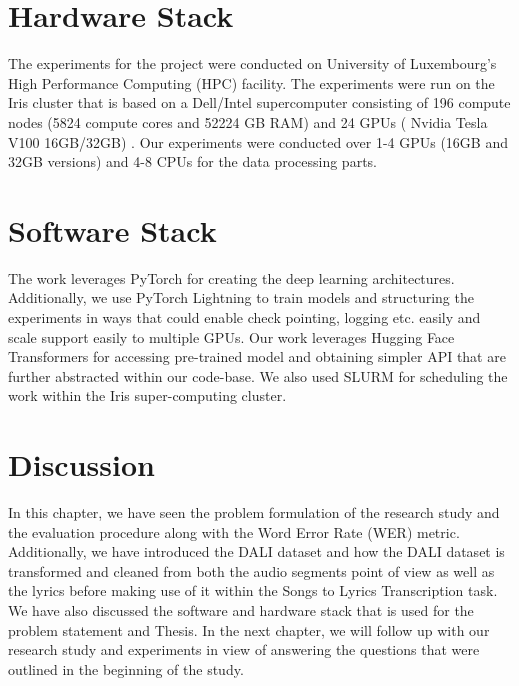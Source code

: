 \section{Hardware Stack}%
\label{sec:hpc}
The experiments for the project were conducted on University of Luxembourg's High Performance Computing (HPC) facility. The experiments were run on the Iris cluster that is based on a Dell/Intel supercomputer consisting of 196 compute nodes (5824 compute cores and 52224 GB RAM) and 24 GPUs ( Nvidia Tesla V100 16GB/32GB) \cite{VBCG_HPCS14}. Our experiments were conducted over 1-4 GPUs (16GB and 32GB versions) and 4-8 CPUs for the data processing parts.

\section{Software Stack}%
\label{sec:softwarestack}

The work leverages PyTorch \cite{paszke2019pytorch} for creating the deep learning architectures. Additionally, we use PyTorch Lightning\cite{Falcon_PyTorch_Lightning_2019} to train models and structuring the experiments in ways that could enable check pointing, logging etc. easily and scale support easily to multiple GPUs. Our work leverages Hugging Face Transformers \cite{wolf-etal-2020-transformers} for accessing pre-trained model and obtaining simpler API that are further abstracted within our code-base. We also used SLURM \cite{yoo2003slurm} for scheduling the work within the Iris super-computing cluster.


\section{Discussion}

In this chapter, we have seen the problem formulation of the research study and the evaluation procedure along with the Word Error Rate (WER) metric. Additionally, we have introduced the DALI dataset and how the DALI dataset is transformed and cleaned from both the audio segments point of view as well as the lyrics before making use of it within the Songs to Lyrics Transcription task. We have also discussed the software and hardware stack that is used for the problem statement and Thesis. In the next chapter, we will follow up with our research study and experiments in view of answering the questions that were outlined in the beginning of the study.
